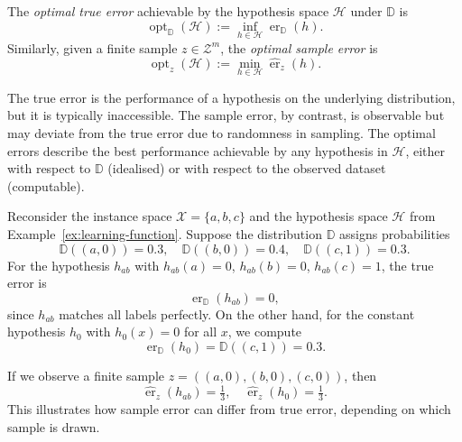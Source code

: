 \begin{definition}
    The \emph{optimal true error} achievable by the hypothesis space $\mathcal{H}$ under $\mathbb{D}$ is
    \[
        \operatorname{opt}_{\mathbb{D}}(\mathcal{H}) := \inf_{h\in\mathcal{H}} \operatorname{er}_{\mathbb{D}}(h).
    \]
    Similarly, given a finite sample $z \in \mathcal{Z}^m$, the \emph{optimal sample error} is
    \[
        \operatorname{opt}_{z}(\mathcal{H}) := \min_{h\in\mathcal{H}} \hat{\operatorname{er}}_{z}(h).
    \]
\end{definition}

\medskip

The true error is the performance of a hypothesis on the underlying distribution, but it is typically inaccessible.
The sample error, by contrast, is observable but may deviate from the true error due to randomness in sampling.
The optimal errors describe the best performance achievable by any hypothesis in $\mathcal{H}$, either with respect to $\mathbb{D}$ (idealised) or with respect to the observed dataset (computable).

\begin{example}
    Reconsider the instance space $\mathcal{X}=\{a,b,c\}$ and the hypothesis space $\mathcal{H}$ from Example~\ref{ex:learning-function}.
    Suppose the distribution $\mathbb{D}$ assigns probabilities
    \[
        \mathbb{D}((a,0))=0.3,\quad \mathbb{D}((b,0))=0.4,\quad \mathbb{D}((c,1))=0.3.
    \]
    For the hypothesis $h_{ab}$ with $h_{ab}(a)=0$, $h_{ab}(b)=0$, $h_{ab}(c)=1$, the true error is
    \[
        \operatorname{er}_{\mathbb{D}}(h_{ab}) = 0,
    \]
    since $h_{ab}$ matches all labels perfectly.
    On the other hand, for the constant hypothesis $h_0$ with $h_0(x)=0$ for all $x$, we compute
    \[
        \operatorname{er}_{\mathbb{D}}(h_0) = \mathbb{D}((c,1)) = 0.3.
    \]

    If we observe a finite sample $z=((a,0),(b,0),(c,0))$, then
    \[
        \hat{\operatorname{er}}_z(h_{ab}) = \tfrac{1}{3}, \quad
        \hat{\operatorname{er}}_z(h_{0}) = \tfrac{1}{3}.
    \]
    This illustrates how sample error can differ from true error, depending on which sample is drawn.
\end{example}





